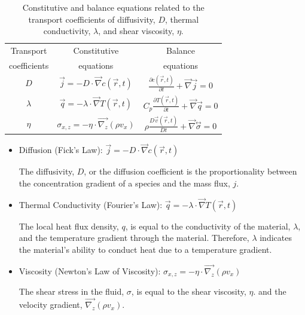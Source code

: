 \begin{table}[h]
\centering
\caption{Constitutive and balance equations related to the transport coefficients of diffusivity, $D$, thermal conductivity, $\lambda$, and shear viscosity, $\eta$.  
\label{tab:coeff}}
\renewcommand*{\arraystretch}{2}
\begin{tabular}{ ccc }
\toprule
Transport & Constitutive & Balance\\
coefficients& equations& equations\\
\hline
$D$ & $\vec{j} = -D \cdot \vec{\nabla}c(\vec{r},t)$ & $\frac{\partial c(\vec{r},t)}{\partial t}+\vec{\nabla}\vec{j}=0$ \\
$\lambda$ & $\vec{q} = -\lambda \cdot \vec{\nabla}T(\vec{r},t)$ & $C_p \frac{\partial T(\vec{r},t)}{\partial t}+\vec{\nabla}\vec{q}=0$ \\
$\eta$ & $\sigma_{x,z} = -\eta \cdot \vec{\nabla_{z}}(\rho v_x)$ & $\rho \frac{D\vec{v}(\vec{r}, t)}{Dt}+\vec{\nabla} \overset{\leftrightarrow}{\sigma}=0$\\
\bottomrule
\end{tabular}
\end{table}
\begin{itemize}
    \item Diffusion (Fick’s Law):
$\vec{j} = -D \cdot \vec{\nabla}c(\vec{r},t)$

The diffusivity, $D$, or the diffusion coefficient is the proportionality between the concentration gradient of a species and the mass flux, $j$. 

\item Thermal Conductivity (Fourier’s Law):
$\vec{q} = -\lambda \cdot \vec{\nabla}T(\vec{r},t)$

The local heat flux density, $q$, is equal to the conductivity of the material, $\lambda$, and the temperature gradient through the material. Therefore, $\lambda$ indicates the material's ability to conduct heat due to a temperature gradient. 

\item Viscosity (Newton’s Law of Viscosity): 
$\sigma_{x,z} = -\eta \cdot \vec{\nabla_{z}}(\rho v_x)$

The shear stress in the fluid, $\sigma$, is equal to the shear viscosity, $\eta$. and the velocity gradient, $\vec{\nabla_{z}}(\rho v_x)$.


\end{itemize}


